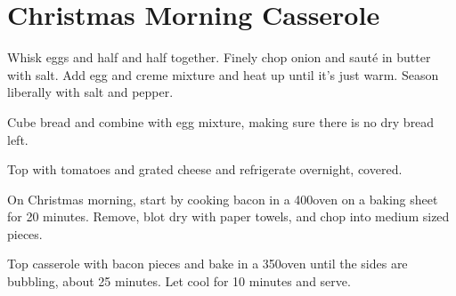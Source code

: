 
\section{Christmas Morning Casserole}
\begin{recipe}



Whisk eggs and half and half together. Finely chop onion and sauté in butter with salt. Add egg and creme mixture and heat up until it's just warm. Season liberally with salt and pepper.

Cube bread and combine with egg mixture, making sure there is no dry bread left.

Top with tomatoes and grated cheese and refrigerate overnight, covered.


On Christmas morning, start by cooking bacon in a 400\degree oven on a baking sheet for 20 minutes. Remove, blot dry with paper towels, and chop into medium sized pieces.

Top casserole with bacon pieces and bake in a 350\degree oven until the sides are bubbling, about 25 minutes. Let cool for 10 minutes and serve.

\end{recipe}
